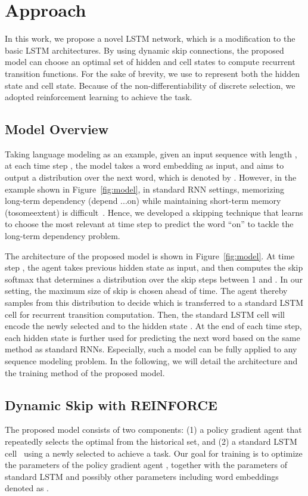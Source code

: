 \documentclass[letterpaper]{article} \usepackage{aaai19}  \usepackage{times}  \usepackage{helvet}  \usepackage{courier}  \usepackage{url}  \usepackage{graphicx}  \usepackage{amsmath}
\begin{document}
\section{Approach}
In this work, we propose a novel LSTM network, which is a modification to the basic LSTM architectures. By using dynamic skip connections, the proposed model can choose an optimal set of hidden and cell states to compute recurrent transition functions. For the sake of brevity, we use  to represent both the hidden state and cell state. Because of the non-differentiability of discrete selection, we adopted reinforcement learning to achieve the task.



\subsection{Model Overview}
Taking language modeling as an example, given an input sequence  with length , at each time step , the model takes a word embedding  as input, and aims to output a distribution over the next word, which is denoted by . However, in the example shown in Figure~\ref{fig:model}, in standard RNN settings, memorizing long-term dependency (depend ...on) while maintaining short-term memory (tosomeextent) is difficult~\cite{chang2017dilated}. Hence, we developed a skipping technique that learns to choose the most relevant  at time step  to predict the word ``on'' to tackle the long-term dependency problem.

The architecture of the proposed model is shown in Figure~\ref{fig:model}. At time step , the agent takes previous hidden state  as input, and then computes the skip softmax that determines a distribution over the skip steps between 1 and . In our setting, the maximum size of skip  is chosen ahead of time. The agent thereby samples from this distribution to decide which  is transferred to a standard LSTM cell for recurrent transition computation. Then, the standard LSTM cell will encode the newly selected  and  to the hidden state . At the end of each time step, each hidden state  is further used for predicting the next word based on the same method as standard RNNs. Especially, such a model can be fully applied to any sequence modeling problem. In the following, we will detail the architecture and the training method of the proposed model.




\subsection{Dynamic Skip with REINFORCE}
The proposed model consists of two components: (1) a policy gradient agent that repeatedly selects the optimal  from the historical  set, and (2) a standard LSTM cell~\cite{hochreiter1997long} using a newly selected  to achieve a task. Our goal for training is to optimize the parameters of the policy gradient agent , together with the parameters of standard LSTM and possibly other parameters including word embeddings denoted as . 
\end{document}
